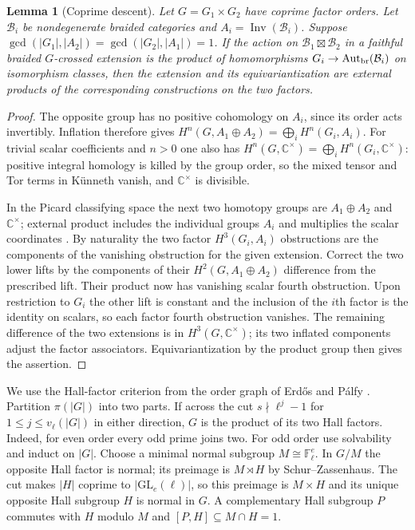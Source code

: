 \documentclass[11pt,a4paper]{article}
\numberwithin{equation}{section}
\newtheorem{lemma}[theorem]{Lemma}
\theoremstyle{remark}
\newcommand{\Inv}{\operatorname{Inv}}
\newcommand{\CC}{\mathbb C}
\begin{document}
\begin{lemma}[Coprime descent]\label{fam:M:13.2}\label{lem:uc-descent}
Let $G=G_1\times G_2$ have coprime factor orders. Let $\mathcal B_i$
be nondegenerate braided categories and $A_i=\Inv(\mathcal B_i)$.
Suppose $\gcd(|G_1|,|A_2|)=\gcd(|G_2|,|A_1|)=1$. If the action on
$\mathcal B_1\boxtimes\mathcal B_2$ in a faithful braided
$G$-crossed extension is the product of homomorphisms
$G_i\to\operatorname{Aut}_{\rm br}(\mathcal B_i)$ on isomorphism
classes, then the extension and its equivariantization are external
products of the corresponding constructions on the two factors.
\end{lemma}
\begin{proof}
The opposite group has no positive cohomology on $A_i$, since its
order acts invertibly. Inflation therefore gives
$H^n(G,A_1\oplus A_2)=\bigoplus_i H^n(G_i,A_i)$. For trivial
scalar coefficients and $n>0$ one also has
$H^n(G,\CC^\times)=\bigoplus_iH^n(G_i,\CC^\times)$:
positive integral homology is killed by the group order, so the
mixed tensor and Tor terms in K\"unneth vanish, and $\CC^\times$ is divisible.

In the Picard classifying space the next two homotopy groups are
$A_1\oplus A_2$ and $\CC^\times$; external product includes the
individual groups $A_i$ and multiplies the scalar coordinates
\cite[Theorem~5.2, Proposition~7.3 and Theorem~7.12]{ENOH}. By
naturality the two factor $H^3(G_i,A_i)$ obstructions are the components
of the vanishing obstruction for the given extension. Correct the two
lower lifts by the components of their $H^2(G,A_1\oplus A_2)$
difference from the prescribed lift. Their product now has vanishing
scalar fourth obstruction. Upon restriction to $G_i$ the other lift
is constant and the inclusion of the $i$th factor is the identity
on scalars, so each factor fourth obstruction vanishes. The remaining
difference of the two extensions is in $H^3(G,\CC^\times)$; its two
inflated components adjust the factor associators. Equivariantization
by the product group then gives the assertion.
\end{proof}

We use the Hall-factor criterion from the order graph of
Erd\H{o}s and P\'alfy \cite{ErdosPalfy}. Partition $\pi(|G|)$ into
two parts. If across the cut $s\nmid\ell^j-1$ for
$1\le j\le v_\ell(|G|)$ in either direction, $G$ is the product of
its two Hall factors. Indeed, for even order every odd prime joins two.
For odd order use solvability \cite[p.~775]{FT} and induct on $|G|$.
Choose a minimal normal subgroup $M\cong\mathbb F_\ell^e$. In
$G/M$ the opposite Hall factor is normal; its preimage is
$M\rtimes H$ by Schur--Zassenhaus. The cut makes $|H|$ coprime to
$|\mathrm{GL}_e(\ell)|$, so this preimage is $M\times H$ and its
unique opposite Hall subgroup $H$ is normal in $G$. A complementary
Hall subgroup $P$ commutes with $H$ modulo $M$ and
$[P,H]\subseteq M\cap H=1$.
\end{document}
